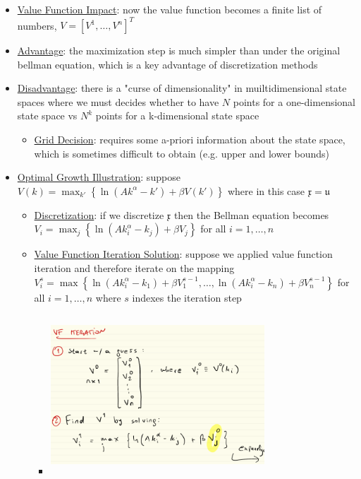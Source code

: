 \documentclass{article}
\begin{document}
\begin{itemize}
    \item \underline{Value Function Impact}: now the value function becomes a finite list of numbers, $V = [V^{1}, \dots, V^{n}]^{T}$
    \item  \underline{Advantage}: the maximization step is much simpler than under the original bellman equation, which is a key advantage of discretization methods
    \item  \underline{Disadvantage}: there is a "curse of dimensionality" in muiltidimensional state spaces where we must decides whether to have $N$ points for a one-dimensional state space vs $N^{k}$ points for a k-dimensional state space
    \begin{itemize}
        \item  \underline{Grid Decision}: requires some a-priori information about the state space, which is sometimes difficult to obtain (e.g. upper and lower bounds)
    \end{itemize}
    \item  \underline{Optimal Growth Illustration}: suppose $V(k) = \max_{k'} \left\{ \ln (Ak^{\alpha} - k') + \beta V(k') \right\}$ where in this case $\mathfrak{x} = \mathfrak{u}$
    \begin{itemize}
        \item \underline{Discretization}: if we discretize $\mathfrak{x}$ then the Bellman equation becomes $V_{i} = \max_{j} \left\{ \ln (Ak^{\alpha}_{i} - k_{j}) + \beta V_{j} \right\}$ for all $i = 1, \dots, n$
        \item \underline{Value Function Iteration Solution}: suppose we applied value function iteration and therefore iterate on the mapping $V_{i}^{s} = \max \left\{ \ln(Ak^{\alpha}_{i} - k_{1}) + \beta V_{1}^{s-1}, \dots, \ln(Ak_{i}^{\alpha} - k_{n}) + \beta V_{n}^{s-1} \right\}$ for all $i = 1, \dots, n$ where $s$ indexes the iteration step
        \begin{itemize}
            \item \includegraphics[width=8cm, height=6cm]{pic1}

\end{itemize}
\end{itemize}
\end{itemize}
\end{document}
